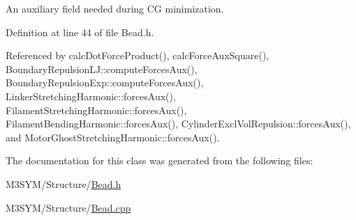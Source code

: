 An auxiliary field needed during C\+G minimization. 



Definition at line 44 of file Bead.\+h.



Referenced by calc\+Dot\+Force\+Product(), calc\+Force\+Aux\+Square(), Boundary\+Repulsion\+L\+J\+::compute\+Forces\+Aux(), Boundary\+Repulsion\+Exp\+::compute\+Forces\+Aux(), Linker\+Stretching\+Harmonic\+::forces\+Aux(), Filament\+Stretching\+Harmonic\+::forces\+Aux(), Filament\+Bending\+Harmonic\+::forces\+Aux(), Cylinder\+Excl\+Vol\+Repulsion\+::forces\+Aux(), and Motor\+Ghost\+Stretching\+Harmonic\+::forces\+Aux().



The documentation for this class was generated from the following files\+:\begin{DoxyCompactItemize}
\item 
M3\+S\+Y\+M/\+Structure/\hyperlink{Bead_8h}{Bead.\+h}\item 
M3\+S\+Y\+M/\+Structure/\hyperlink{Bead_8cpp}{Bead.\+cpp}\end{DoxyCompactItemize}
